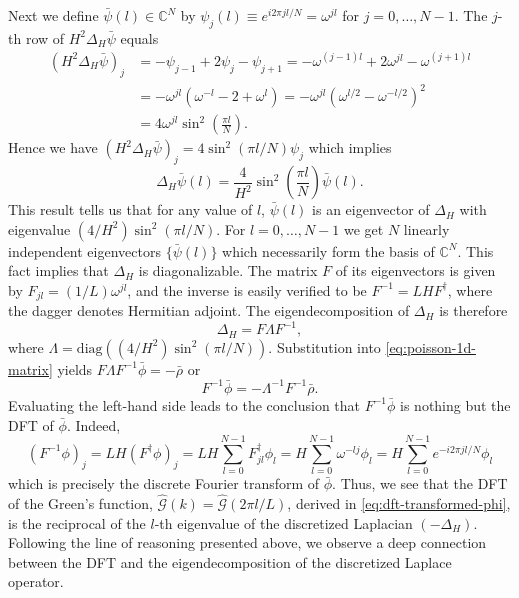 Next we define $\bar{\psi}(l) \in \mathbb{C}^N$ by $\psi_j(l) \equiv e^{i2\pi jl/N} = \omega^{jl}$ for $j=0,\dots,N-1$.
The $j$-th row of $H^2\Delta_H \bar{\psi}$ equals
\begin{align*}
    (H^2\Delta_H \bar{\psi})_j
     & = -\psi_{j-1} + 2\psi_j - \psi_{j+1}
    = -\omega^{(j-1)l} + 2\omega^{jl} - \omega^{(j+1)l}     \\
     & = -\omega^{jl}(\omega^{-l} - 2 + \omega^l)
    = -\omega^{jl}(\omega^{l/2} - \omega^{-l/2})^2          \\
     & = 4\omega^{jl} \sin^2\left( \frac{\pi l}{N} \right).
\end{align*}
Hence we have $(H^2\Delta_H \bar{\psi})_j = 4\sin^2(\pi l/N) \psi_j$ which implies
\begin{equation*}
    \Delta_H \bar{\psi}(l)
    = \frac{4}{H^2} \sin^2\left( \frac{\pi l}{N} \right) \bar{\psi}(l).
\end{equation*}
This result tells us that for any value of $l$, $\bar{\psi}(l)$ is an eigenvector of $\Delta_H$ with eigenvalue $(4/H^2)\sin^2(\pi l/N)$.
For $l=0,\dots, N-1$ we get $N$ linearly independent eigenvectors $\{\bar{\psi}(l)\}$ which necessarily form the basis of $\mathbb{C}^N$.
This fact implies that $\Delta_H$ is diagonalizable.
The matrix $F$ of its eigenvectors is given by $F_{jl} = (1/L) \omega^{jl}$, and the inverse is easily verified to be $F^{-1} = LH F^\dagger$, where the dagger denotes Hermitian adjoint.
The eigendecomposition of $\Delta_H$ is therefore
\begin{equation*}
    \Delta_H = F\Lambda F^{-1},
\end{equation*}
where $\Lambda = \text{diag}((4/H^2)\sin^2(\pi l/N))$.
Substitution into \autoref{eq:poisson-1d-matrix} yields $F\Lambda F^{-1} \bar{\phi} = -\bar{\rho}$ or
\begin{equation*}
    F^{-1}\bar{\phi} = -\Lambda^{-1}F^{-1}\bar{\rho}.
\end{equation*}
Evaluating the left-hand side leads to the conclusion that $F^{-1}\bar\phi$ is nothing but the DFT of $\bar\phi$.
Indeed,
\begin{equation*}
    (F^{-1}\phi)_j
    = LH (F^\dagger \phi)_j
    = LH \sum_{l=0}^{N-1}F^\dagger_{jl}\phi_l
    = H \sum_{l=0}^{N-1}\omega^{-lj}\phi_l
    = H \sum_{l=0}^{N-1}e^{-i2\pi jl / N}\phi_l
\end{equation*}
which is precisely the discrete Fourier transform of $\bar\phi$.
Thus, we see that the DFT of the Green's function, $\hat{\mathcal{G}}(k) = \hat{\mathcal{G}}(2\pi l / L)$, derived in \autoref{eq:dft-transformed-phi}, is the reciprocal of the $l$-th eigenvalue of the discretized Laplacian $(-\Delta_H)$.
Following the line of reasoning presented above, we observe a deep connection between the DFT and the eigendecomposition of the discretized Laplace operator.

